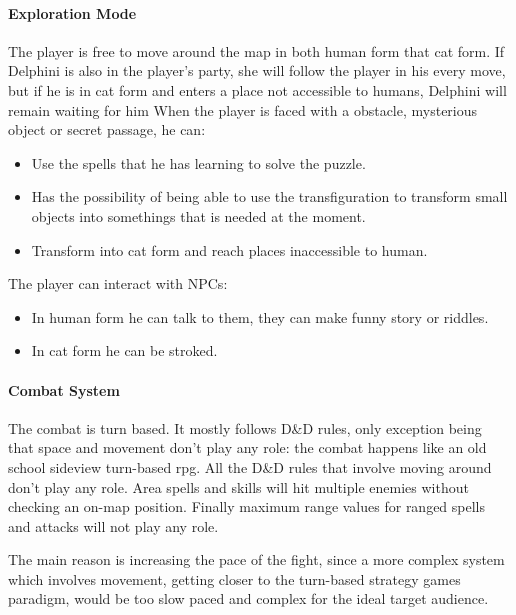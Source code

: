 \paragraph{Exploration Mode}

The player is free to move around  the map in both human form that cat form. If Delphini is also in the player's party, she will follow the player in his every move, but if he is in cat form and enters a place not accessible to humans, Delphini will remain waiting for him When the player is faced with a obstacle, mysterious object or secret passage, he can: 

\begin{itemize}
    \item Use the spells that he has learning to solve the puzzle.
    \item Has the possibility of being able to use the transfiguration to transform small objects into somethings that is needed at the moment.
    \item Transform into cat form and reach places inaccessible to human.
\end{itemize}

The player can interact with NPCs:

\begin{itemize}
    \item In human form he can talk to them, they can make funny story or riddles.
    \item In cat form he can be stroked.
\end{itemize}


\pagebreak 

\paragraph{Combat System}
The combat is turn based. It mostly follows D\&D rules, only exception being that space and movement don't play any role: the combat happens like an old school sideview turn-based rpg. All the D\&D rules that involve moving around don't play any role. Area spells and skills will hit multiple enemies without checking an on-map position. Finally maximum range values for ranged spells and attacks will not play any role.

The main reason is increasing the pace of the fight, since a more complex system which involves movement, getting closer to the turn-based strategy games paradigm, would be too slow paced and complex for the ideal target audience.

